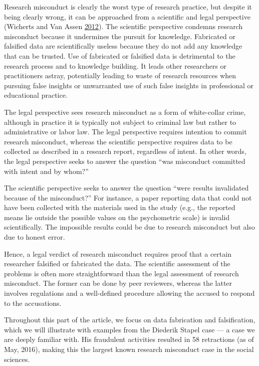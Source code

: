 \documentclass[a5paper]{book}
\begin{document}
Research misconduct is clearly the worst type of research practice, but
despite it being clearly wrong, it can be approached from a scientific
and legal perspective (Wicherts and Van Assen
\protect\hyperlink{ref-doi:10.1038ux2f488591b}{2012}). The scientific
perspective condemns research misconduct because it undermines the
pursuit for knowledge. Fabricated or falsified data are scientifically
useless because they do not add any knowledge that can be trusted. Use
of fabricated or falsified data is detrimental to the research process
and to knowledge building. It leads other researchers or practitioners
astray, potentially leading to waste of research resources when pursuing
false insights or unwarranted use of such false insights in professional
or educational practice.

The legal perspective sees research misconduct as a form of white-collar
crime, although in practice it is typically not subject to criminal law
but rather to administrative or labor law. The legal perspective
requires intention to commit research misconduct, whereas the scientific
perspective requires data to be collected as described in a research
report, regardless of intent. In other words, the legal perspective
seeks to answer the question \enquote{was misconduct committed with
intent and by whom?}

The scientific perspective seeks to answer the question \enquote{were
results invalidated because of the misconduct?} For instance, a paper
reporting data that could not have been collected with the materials
used in the study (e.g., the reported means lie outside the possible
values on the psychometric scale) is invalid scientifically. The
impossible results could be due to research misconduct but also due to
honest error.

Hence, a legal verdict of research misconduct requires proof that a
certain researcher falsified or fabricated the data. The scientific
assessment of the problems is often more straightforward than the legal
assessment of research misconduct. The former can be done by peer
reviewers, whereas the latter involves regulations and a well-defined
procedure allowing the accused to respond to the accusations.

Throughout this part of the article, we focus on data fabrication and
falsification, which we will illustrate with examples from the Diederik
Stapel case --- a case we are deeply familiar with. His fraudulent
activities resulted in 58 retractions (as of May, 2016), making this the
largest known research misconduct case in the social sciences.
\end{document}
